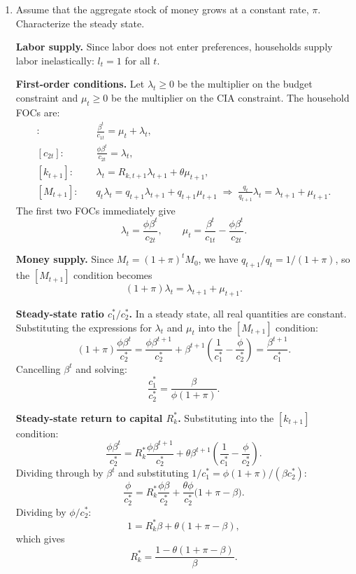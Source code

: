 \documentclass[11pt,english]{article}
\begin{document}
\begin{enumerate}
\item[(b)] Assume that the aggregate stock of money grows at a constant rate,
    $\pi$. Characterize the steady state.
\begin{solution}
 
\noindent\textbf{Labor supply.} Since labor does not enter preferences,
households supply labor inelastically: $l_t = 1$ for all $t$.
 
\medskip
\noindent\textbf{First-order conditions.} Let $\lambda_t \geq 0$ be the
multiplier on the budget constraint and $\mu_t \geq 0$ be the multiplier on
the CIA constraint. The household FOCs are:
\begin{align*}
    [c_{1t}]:&\quad \frac{\beta^t}{c_{1t}} = \mu_t + \lambda_t, \\[4pt]
    [c_{2t}]:&\quad \frac{\phi\beta^t}{c_{2t}} = \lambda_t, \\[4pt]
    [k_{t+1}]:&\quad \lambda_t = R_{k,t+1}\lambda_{t+1} + \theta\mu_{t+1}, \\[4pt]
    [M_{t+1}]:&\quad q_t\lambda_t = q_{t+1}\lambda_{t+1} + q_{t+1}\mu_{t+1}
    \;\Rightarrow\; \frac{q_t}{q_{t+1}}\lambda_t = \lambda_{t+1} + \mu_{t+1}.
\end{align*}
The first two FOCs immediately give
\[
    \lambda_t = \frac{\phi\beta^t}{c_{2t}}, \qquad
    \mu_t = \frac{\beta^t}{c_{1t}} - \frac{\phi\beta^t}{c_{2t}}.
\]
 
\medskip
\noindent\textbf{Money supply.} Since $M_t = (1+\pi)^t M_0$, we have
$q_{t+1}/q_t = 1/(1+\pi)$, so the $[M_{t+1}]$ condition becomes
\[
    (1+\pi)\lambda_t = \lambda_{t+1} + \mu_{t+1}.
\]
 
\medskip
\noindent\textbf{Steady-state ratio $c_1^*/c_2^*$.} In a steady state, all
real quantities are constant. Substituting the expressions for $\lambda_t$ and
$\mu_t$ into the $[M_{t+1}]$ condition:
\[
    (1+\pi)\frac{\phi\beta^t}{c_2^*}
    = \frac{\phi\beta^{t+1}}{c_2^*}
      + \beta^{t+1}\!\left(\frac{1}{c_1^*} - \frac{\phi}{c_2^*}\right)
    = \frac{\beta^{t+1}}{c_1^*}.
\]
Cancelling $\beta^t$ and solving:
\[
    \boxed{\frac{c_1^*}{c_2^*} = \frac{\beta}{\phi(1+\pi)}.}
\]
 
\medskip
\noindent\textbf{Steady-state return to capital $R_k^*$.} Substituting into
the $[k_{t+1}]$ condition:
\[
    \frac{\phi\beta^t}{c_2^*}
    = R_k^*\frac{\phi\beta^{t+1}}{c_2^*}
      + \theta\beta^{t+1}\!\left(\frac{1}{c_1^*} - \frac{\phi}{c_2^*}\right).
\]
Dividing through by $\beta^t$ and substituting $1/c_1^* = \phi(1+\pi)/(\beta
c_2^*)$:
\[
    \frac{\phi}{c_2^*}
    = R_k^*\frac{\phi\beta}{c_2^*}
      + \frac{\theta\phi}{c_2^*}\bigl(1+\pi - \beta\bigr).
\]
Dividing by $\phi/c_2^*$:
\[
    1 = R_k^*\beta + \theta(1+\pi-\beta),
\]
which gives
\[
    \boxed{R_k^* = \frac{1 - \theta(1+\pi-\beta)}{\beta}.}
\]
 

\end{solution}
\end{enumerate}
\end{document}

